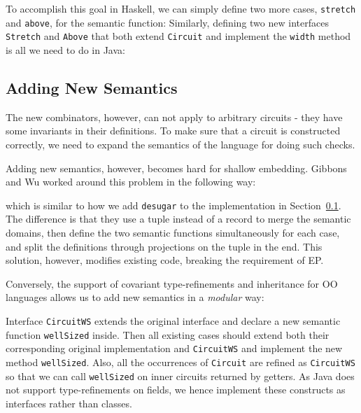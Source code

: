 To accomplish this goal in Haskell, we can simply define two more cases,
\texttt{stretch} and \texttt{above}, for the semantic function:
Similarly, defining two new interfaces
\texttt{Stretch} and \texttt{Above} that both extend \texttt{Circuit} and
implement the \texttt{width} method is all we need to do in Java:


\subsection{Adding New Semantics}
The new combinators, however, can not apply to arbitrary circuits - they have
some invariants in their definitions.
To make sure that a circuit is constructed correctly, we need to expand the
semantics of the language for doing such checks.

Adding new semantics, however, becomes hard for shallow embedding.
Gibbons and Wu worked around this problem in the following way:

which is similar to how we add \texttt{desugar} to the implementation in Section~\ref{}.
The difference is that they use a tuple instead of a record to merge the
semantic domains, then define the two semantic functions simultaneously for each
case, and split the definitions through projections on the tuple in the end.
This solution, however, modifies existing code, breaking the requirement of EP.

Conversely, the support of covariant type-refinements and inheritance for OO
languages allows us to add new semantics in a \emph{modular} way:

Interface \texttt{CircuitWS} extends the original interface and declare a new
semantic function \texttt{wellSized} inside.
Then all existing cases should extend both their corresponding original
implementation and \texttt{CircuitWS} and implement the new method
\texttt{wellSized}. Also, all the occurrences of \texttt{Circuit} are
refined as \texttt{CircuitWS} so that we can call \texttt{wellSized} on inner circuits returned by getters.
As Java does not support type-refinements on fields, we hence implement these
constructs as interfaces rather than classes.

